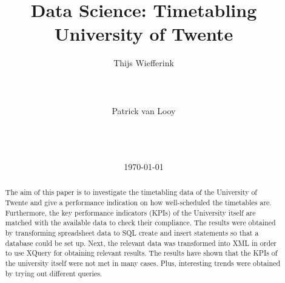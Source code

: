 \documentclass{sig-alternate-br} %
\begin{document}
\title{Data Science: Timetabling University of Twente}

\author{
\alignauthor Thijs Wiefferink\\
       \\
       \\
       \\
\alignauthor Patrick van Looy\\
       \\
       \\
       \\
}
\date{\today}


\maketitle

\begin{abstract}
The aim of this paper is to investigate the timetabling data of the University of Twente and give a performance indication on how well-scheduled the timetables are. Furthermore, the key performance indicators (KPIs) of the University itself are matched with the available data to check their compliance. The results were obtained by transforming spreadsheet data to SQL create and insert statements so that a database could be set up. Next, the relevant data was transformed into XML in order to use XQuery for obtaining relevant results. The results have shown that the KPIs of the university itself were not met in many cases. Plus, interesting trends were obtained by trying out different queries.
\end{abstract}













\end{document}
